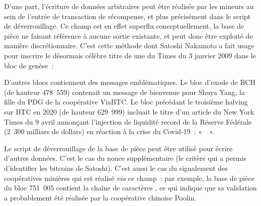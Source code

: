 D'une part, l'écriture de données arbitraires peut être réalisée par les mineurs au sein de l'entrée de transaction de récompense, et plus précisément dans le script de déverrouillage. Ce champ est en effet superflu conceptuellement, la base de pièce ne faisant référence à aucune sortie existante, et peut donc être exploité de manière discrétionnaire. C'est cette méthode dont Satoshi Nakamoto a fait usage pour inscrire le désormais célèbre titre de une du Times du 3 janvier 2009 dans le bloc de genèse~:

\begin{quote}
\end{quote}

D'autres blocs contiennent des messages emblématiques. Le bloc d'exode de BCH (de hauteur 478~559) contenait un message de bienvenue pour Shuya Yang, la fille du PDG de la coopérative ViaBTC. Le bloc précédant le troisième halving sur BTC en 2020 (de hauteur 629~999) incluait le titre d'un article du New York Times du 9 avril annonçant l'injection de liquidité record de la Réserve Fédérale (2~300 milliars de dollars) en réaction à la crise du Covid-19~: «~~».

Le script de déverrouillage de la base de pièce peut être utilisé pour écrire d'autres données. C'est le cas du nonce supplémentaire (le critère qui a permis d'identifier les bitcoins de Satoshi). C'est aussi le cas du signalement des coopératives minières qui est réalisé \emph{via} ce champ~: par exemple, la base de pièce du bloc 751~005 contient la chaîne de caractères , ce qui indique que sa validation a probablement été réalisée par la coopérative chinoise Poolin.

